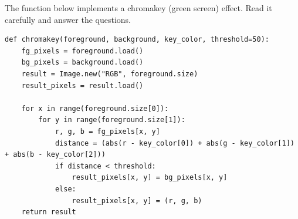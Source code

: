\documentclass{csexam}
\begin{document}
\begin{questions}
\newpage

\question[4] The function below implements a chromakey (green screen) effect. Read it carefully and answer the questions.

\begin{lstlisting}
def chromakey(foreground, background, key_color, threshold=50):
    fg_pixels = foreground.load()
    bg_pixels = background.load()
    result = Image.new("RGB", foreground.size)
    result_pixels = result.load()

    for x in range(foreground.size[0]):
        for y in range(foreground.size[1]):
            r, g, b = fg_pixels[x, y]
            distance = (abs(r - key_color[0]) + abs(g - key_color[1]) + abs(b - key_color[2]))
            if distance < threshold:
                result_pixels[x, y] = bg_pixels[x, y]
            else:
                result_pixels[x, y] = (r, g, b)
    return result
\end{lstlisting}


\end{questions}
\end{document}
